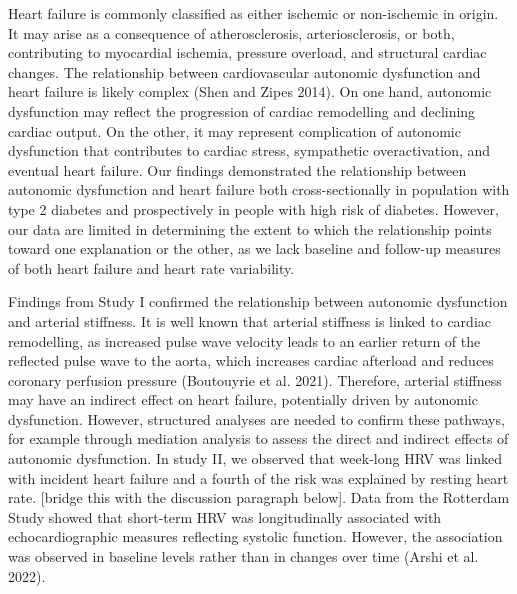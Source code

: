 \documentclass[
  a4paper,
  headsepline=true,
  open=any]{scrbook}
\begin{document}
Heart failure is commonly classified as either ischemic or non-ischemic
in origin. It may arise as a consequence of atherosclerosis,
arteriosclerosis, or both, contributing to myocardial ischemia, pressure
overload, and structural cardiac changes. The relationship between
cardiovascular autonomic dysfunction and heart failure is likely complex
(Shen and Zipes 2014). On one hand, autonomic dysfunction may reflect
the progression of cardiac remodelling and declining cardiac output. On
the other, it may represent complication of autonomic dysfunction that
contributes to cardiac stress, sympathetic overactivation, and eventual
heart failure. Our findings demonstrated the relationship between
autonomic dysfunction and heart failure both cross-sectionally in
population with type 2 diabetes and prospectively in people with high
risk of diabetes. However, our data are limited in determining the
extent to which the relationship points toward one explanation or the
other, as we lack baseline and follow-up measures of both heart failure
and heart rate variability.

Findings from Study I confirmed the relationship between autonomic
dysfunction and arterial stiffness. It is well known that arterial
stiffness is linked to cardiac remodelling, as increased pulse wave
velocity leads to an earlier return of the reflected pulse wave to the
aorta, which increases cardiac afterload and reduces coronary perfusion
pressure (Boutouyrie et al. 2021). Therefore, arterial stiffness may
have an indirect effect on heart failure, potentially driven by
autonomic dysfunction. However, structured analyses are needed to
confirm these pathways, for example through mediation analysis to assess
the direct and indirect effects of autonomic dysfunction. In study II,
we observed that week-long HRV was linked with incident heart failure
and a fourth of the risk was explained by resting heart rate. {[}bridge
this with the discussion paragraph below{]}. Data from the Rotterdam
Study showed that short-term HRV was longitudinally associated with
echocardiographic measures reflecting systolic function. However, the
association was observed in baseline levels rather than in changes over
time (Arshi et al. 2022).
\end{document}
